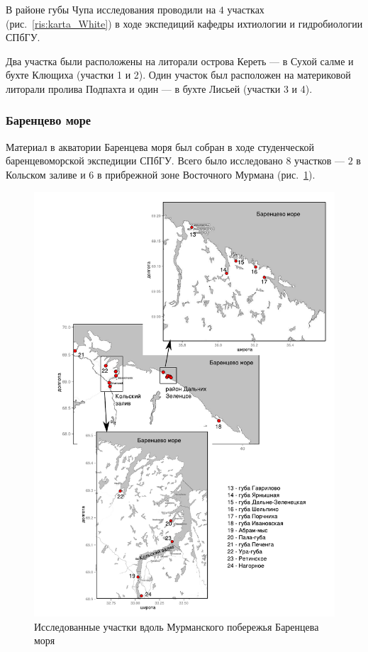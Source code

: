 В районе губы Чупа исследования проводили на $4$ участках (рис.~\ref{ris:karta_White}) в ходе экспедиций кафедры ихтиологии и гидробиологии СПбГУ. 

Два участка были расположены на литорали острова Кереть --- в Сухой салме и бухте Клющиха (участки 1 и 2). 
Один участок был расположен на материковой литорали пролива Подпахта и один --- в бухте Лисьей (участки 3 и 4).


\afterpage{\clearpage}

		\subsubsection{Баренцево море}
Материал  в акватории Баренцева моря  был  собран    в ходе   студенческой баренцевоморской экспедиции СПбГУ. 
Всего было исследовано $8$ участков --- $2$ в Кольском заливе и   $6$  в   прибрежной   зоне  Восточного  Мурмана (рис.~\ref{ris:karta_Barents}).  
	\begin{figure}[p]
    \includegraphics[width=\textwidth]{../maps/Barents_sea1.pdf}
    \caption{Исследованные участки вдоль Мурманского побережья Баренцева моря}
    \label{ris:karta_Barents}
	\end{figure}
